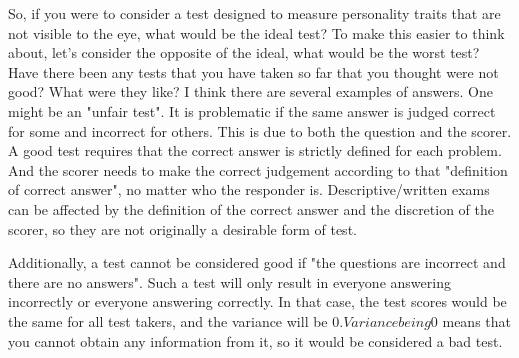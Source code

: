 \documentclass{ltjbook}
\begin{document}
So, if you were to consider a test designed to measure personality traits that are not visible to the eye, what would be the ideal test? To make this easier to think about, let's consider the opposite of the ideal, what would be the worst test? Have there been any tests that you have taken so far that you thought were not good? What were they like?
I think there are several examples of answers. One might be an "unfair test". It is problematic if the same answer is judged correct for some and incorrect for others. This is due to both the question and the scorer. A good test requires that the correct answer is strictly defined for each problem. And the scorer needs to make the correct judgement according to that "definition of correct answer", no matter who the responder is. Descriptive/written exams can be affected by the definition of the correct answer and the discretion of the scorer, so they are not originally a desirable form of test.

Additionally, a test cannot be considered good if "the questions are incorrect and there are no answers". Such a test will only result in everyone answering incorrectly or everyone answering correctly. In that case, the test scores would be the same for all test takers, and the variance will be $0. Variance being $0 means that you cannot obtain any information from it, so it would be considered a bad test.
\end{document}

